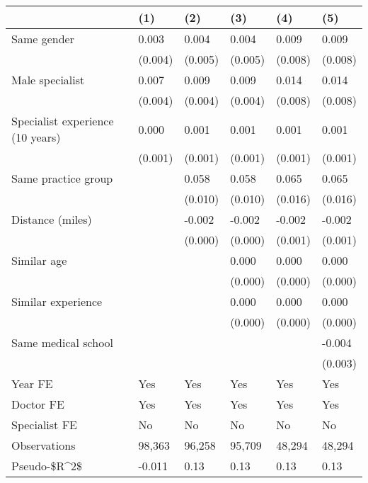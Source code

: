 \begin{tabular}{llllll}
\hline
& (1) & (2) & (3) & (4) & (5) \\ \hline
Same gender                        & 0.003   & 0.004   & 0.004   & 0.009   & 0.009   \\
& (0.004) & (0.005) & (0.005) & (0.008) & (0.008) \\
Male specialist                    & 0.007   & 0.009   & 0.009   & 0.014   & 0.014   \\
& (0.004) & (0.004) & (0.004) & (0.008) & (0.008) \\
Specialist experience (10 years)   & 0.000   & 0.001   & 0.001   & 0.001   & 0.001   \\
& (0.001) & (0.001) & (0.001) & (0.001) & (0.001) \\
Same practice group                &         & 0.058   & 0.058   & 0.065   & 0.065   \\
&         & (0.010) & (0.010) & (0.016) & (0.016) \\
Distance (miles)                   &         & -0.002  & -0.002  & -0.002  & -0.002  \\
&         & (0.000) & (0.000) & (0.001) & (0.001) \\
Similar age                        &         &         & 0.000   & 0.000   & 0.000   \\
&         &         & (0.000) & (0.000) & (0.000) \\
Similar experience                 &         &         & 0.000   & 0.000   & 0.000   \\
&         &         & (0.000) & (0.000) & (0.000) \\
Same medical school                &         &         &         &         & -0.004  \\
&         &         &         &         & (0.003) \\
Year FE                            & Yes     & Yes     & Yes     & Yes     & Yes     \\
Doctor FE                          & Yes     & Yes     & Yes     & Yes     & Yes     \\
Specialist FE                      & No      & No      & No      & No      & No      \\
Observations                       & 98,363  & 96,258  & 95,709  & 48,294  & 48,294  \\
Pseudo-\$R\textasciicircum{}2\$ & -0.011  & 0.13    & 0.13    & 0.13    & 0.13    \\
\hline
\end{tabular}

